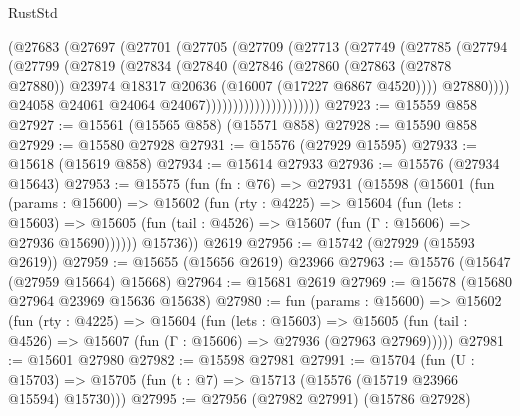 \begin{lexlean}{RustStd}
\begin{coremodule}
                            (@27683
                              (@27697
                                (@27701
                                  (@27705
                                    (@27709
                                      (@27713
                                        (@27749
                                          (@27785
                                            (@27794
                                              (@27799
                                                (@27819
                                                  (@27834
                                                    (@27840
                                                      (@27846
                                                        (@27860
                                                          (@27863 (@27878 @27880))
                                                          @23974
                                                          @18317
                                                          @20636
                                                          (@16007 (@17227 @6867 @4520))))
                                                      @27880))))
                                              @24058
                                              @24061
                                              @24064
                                              @24067)))))))))))))))))))))
@27923 := @15559 @858
@27927 := @15561 (@15565 @858) (@15571 @858)
@27928 := @15590 @858
@27929 := @15580 @27928
@27931 := @15576 (@27929 @15595)
@27933 := @15618 (@15619 @858)
@27934 := @15614 @27933
@27936 := @15576 (@27934 @15643)
@27953 := @15575
    (fun (fn : @76) =>
    @27931
      (@15598
        (@15601
          (fun (params : @15600) =>
          @15602
            (fun (rty : @4225) =>
            @15604
              (fun (lets : @15603) =>
              @15605 (fun (tail : @4526) => @15607 (fun (Γ : @15606) => @27936 @15690))))))
        @15736))
    @2619
@27956 := @15742 (@27929 (@15593 @2619))
@27959 := @15655 (@15656 @2619) @23966
@27963 := @15576 (@15647 (@27959 @15664) @15668)
@27964 := @15681 @2619
@27969 := @15678 (@15680 @27964 @23969 @15636 @15638)
@27980 := fun (params : @15600) =>
  @15602
    (fun (rty : @4225) =>
    @15604
      (fun (lets : @15603) =>
      @15605 (fun (tail : @4526) => @15607 (fun (Γ : @15606) => @27936 (@27963 @27969)))))
@27981 := @15601 @27980
@27982 := @15598 @27981
@27991 := @15704
    (fun (U : @15703) => @15705 (fun (t : @7) => @15713 (@15576 (@15719 @23966 @15594) @15730)))
@27995 := @27956 (@27982 @27991) (@15786 @27928)

\end{coremodule}
\end{lexlean}
